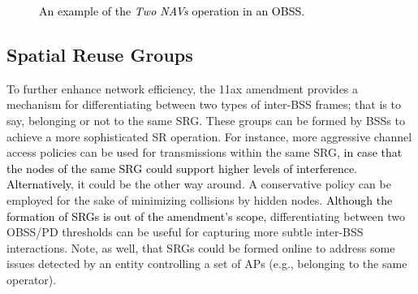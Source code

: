 \documentclass[preprint,12pt]{elsarticle}
\theoremstyle{plain}
\begin{document}
\begin{figure}[ht!]
	\centering
	\hspace{1cm}
	\caption{\textcolor{black}{An example of the \textit{Two NAVs} operation in an OBSS.}}
	\label{fig:two_navs}
\end{figure}

\subsection{Spatial Reuse Groups}
\label{section:srg}
To further enhance network efficiency, the 11ax amendment provides a mechanism for differentiating between two types of inter-BSS frames; that is to say, belonging or not to the same SRG. These groups can be formed by BSSs to achieve a more sophisticated SR operation. For instance, more aggressive channel access policies can be used for transmissions within the same SRG, \textcolor{black}{in case that the nodes of the same SRG could support higher levels of interference}. \textcolor{black}{Alternatively}, it could be the other way around. A conservative policy can be employed for the sake of minimizing collisions by hidden nodes. \textcolor{black}{Although the formation of SRGs is out of the amendment's scope,} differentiating between two OBSS/PD thresholds can be useful for capturing more subtle inter-BSS interactions. Note, as well, that SRGs could be formed online to address some issues detected by an entity controlling a set of APs (e.g., belonging to the same operator).
\end{document}

